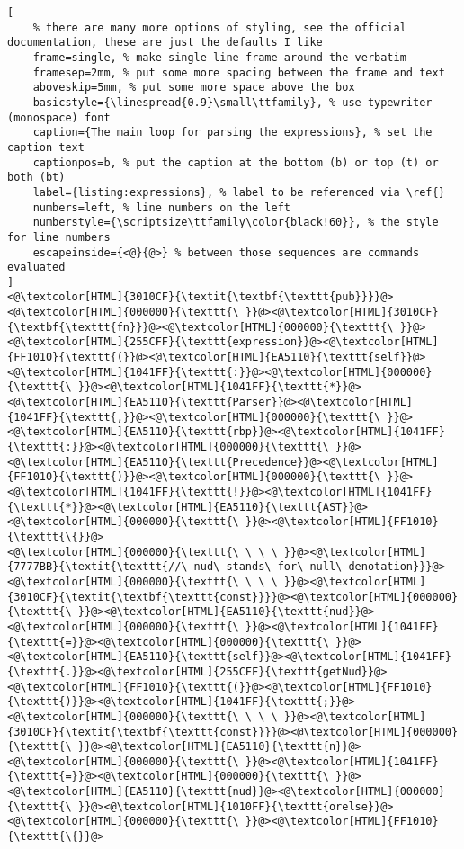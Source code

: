 \begin{lstlisting}[
	% there are many more options of styling, see the official documentation, these are just the defaults I like
	frame=single, % make single-line frame around the verbatim
	framesep=2mm, % put some more spacing between the frame and text
	aboveskip=5mm, % put some more space above the box
	basicstyle={\linespread{0.9}\small\ttfamily}, % use typewriter (monospace) font
	caption={The main loop for parsing the expressions}, % set the caption text
	captionpos=b, % put the caption at the bottom (b) or top (t) or both (bt)
    label={listing:expressions}, % label to be referenced via \ref{}
	numbers=left, % line numbers on the left
	numberstyle={\scriptsize\ttfamily\color{black!60}}, % the style for line numbers
	escapeinside={<@}{@>} % between those sequences are commands evaluated
]
<@\textcolor[HTML]{3010CF}{\textit{\textbf{\texttt{pub}}}}@><@\textcolor[HTML]{000000}{\texttt{\ }}@><@\textcolor[HTML]{3010CF}{\textbf{\texttt{fn}}}@><@\textcolor[HTML]{000000}{\texttt{\ }}@><@\textcolor[HTML]{255CFF}{\texttt{expression}}@><@\textcolor[HTML]{FF1010}{\texttt{(}}@><@\textcolor[HTML]{EA5110}{\texttt{self}}@><@\textcolor[HTML]{1041FF}{\texttt{:}}@><@\textcolor[HTML]{000000}{\texttt{\ }}@><@\textcolor[HTML]{1041FF}{\texttt{*}}@><@\textcolor[HTML]{EA5110}{\texttt{Parser}}@><@\textcolor[HTML]{1041FF}{\texttt{,}}@><@\textcolor[HTML]{000000}{\texttt{\ }}@><@\textcolor[HTML]{EA5110}{\texttt{rbp}}@><@\textcolor[HTML]{1041FF}{\texttt{:}}@><@\textcolor[HTML]{000000}{\texttt{\ }}@><@\textcolor[HTML]{EA5110}{\texttt{Precedence}}@><@\textcolor[HTML]{FF1010}{\texttt{)}}@><@\textcolor[HTML]{000000}{\texttt{\ }}@><@\textcolor[HTML]{1041FF}{\texttt{!}}@><@\textcolor[HTML]{1041FF}{\texttt{*}}@><@\textcolor[HTML]{EA5110}{\texttt{AST}}@><@\textcolor[HTML]{000000}{\texttt{\ }}@><@\textcolor[HTML]{FF1010}{\texttt{\{}}@>
<@\textcolor[HTML]{000000}{\texttt{\ \ \ \ }}@><@\textcolor[HTML]{7777BB}{\textit{\texttt{//\ nud\ stands\ for\ null\ denotation}}}@>
<@\textcolor[HTML]{000000}{\texttt{\ \ \ \ }}@><@\textcolor[HTML]{3010CF}{\textit{\textbf{\texttt{const}}}}@><@\textcolor[HTML]{000000}{\texttt{\ }}@><@\textcolor[HTML]{EA5110}{\texttt{nud}}@><@\textcolor[HTML]{000000}{\texttt{\ }}@><@\textcolor[HTML]{1041FF}{\texttt{=}}@><@\textcolor[HTML]{000000}{\texttt{\ }}@><@\textcolor[HTML]{EA5110}{\texttt{self}}@><@\textcolor[HTML]{1041FF}{\texttt{.}}@><@\textcolor[HTML]{255CFF}{\texttt{getNud}}@><@\textcolor[HTML]{FF1010}{\texttt{(}}@><@\textcolor[HTML]{FF1010}{\texttt{)}}@><@\textcolor[HTML]{1041FF}{\texttt{;}}@>
<@\textcolor[HTML]{000000}{\texttt{\ \ \ \ }}@><@\textcolor[HTML]{3010CF}{\textit{\textbf{\texttt{const}}}}@><@\textcolor[HTML]{000000}{\texttt{\ }}@><@\textcolor[HTML]{EA5110}{\texttt{n}}@><@\textcolor[HTML]{000000}{\texttt{\ }}@><@\textcolor[HTML]{1041FF}{\texttt{=}}@><@\textcolor[HTML]{000000}{\texttt{\ }}@><@\textcolor[HTML]{EA5110}{\texttt{nud}}@><@\textcolor[HTML]{000000}{\texttt{\ }}@><@\textcolor[HTML]{1010FF}{\texttt{orelse}}@><@\textcolor[HTML]{000000}{\texttt{\ }}@><@\textcolor[HTML]{FF1010}{\texttt{\{}}@>

\end{lstlisting}
